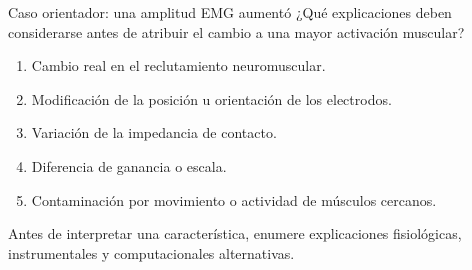 \documentclass[
  ignorenonframetext,
  aspectratio=169,
  spanish,
  professionalfonts]{beamer}
\providecommand{\tightlist}{%
  \setlength{\itemsep}{0pt}\setlength{\parskip}{0pt}}
\begin{document}
\begin{frame}{Caso orientador: una amplitud EMG aumentó}
\protect{}\label{caso-orientador-una-amplitud-emg-aumentuxf3}
¿Qué explicaciones deben considerarse antes de atribuir el cambio a una
mayor activación muscular?

\begin{enumerate}
\tightlist
\item
  Cambio real en el reclutamiento neuromuscular.
\item
  Modificación de la posición u orientación de los electrodos.
\item
  Variación de la impedancia de contacto.
\item
  Diferencia de ganancia o escala.
\item
  Contaminación por movimiento o actividad de músculos cercanos.
\end{enumerate}

\begin{tcolorbox}[enhanced jigsaw, arc=.35mm, bottomrule=.15mm, bottomtitle=1mm, breakable, colback=white, colbacktitle=quarto-callout-tip-color!10!white, colframe=quarto-callout-tip-color-frame, coltitle=black, left=2mm, leftrule=.75mm, opacityback=0, opacitybacktitle=0.6, rightrule=.15mm, title={Regla de análisis}, titlerule=0mm, toprule=.15mm, toptitle=1mm]

Antes de interpretar una característica, enumere explicaciones
fisiológicas, instrumentales y computacionales alternativas.

\end{tcolorbox}
\end{frame}
\end{document}
